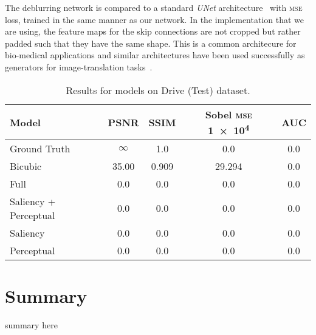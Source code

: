 \documentclass{scrartcl}
\begin{document}
The deblurring network is compared to a standard \textit{UNet} architecture~\cite{Unet} with \textsc{mse} loss, trained in the same manner as our network.
In the implementation that we are using, the feature maps for the skip connections are not cropped but rather padded such that they have the same shape.
This is a common architecure for bio-medical applications and similar architectures have been used successfully as generators for image-translation tasks~\cite{PatchGAN}.


\begin{table}[]
\centering
\caption{Results for models on Drive (Test) dataset.}

\label{tab:results-sr}
\begin{tabular}{@{}lS[table-format=2.3]S[table-format=2.3]S[table-format=2.3]S[table-format=2.3]@{}}
\toprule
{Model} & {PSNR} & {SSIM} & {Sobel \textsc{mse} \SI{1e4}{}} & {AUC} \\ \midrule
Ground Truth & $\infty$ & 1.0 & 0.0 & 0.0 \\
Bicubic & 35.00 & 0.909 & 29.294 & 0.0 \\
Full & 0.0 & 0.0 & 0.0 & 0.0 \\
Saliency + Perceptual & 0.0 & 0.0 & 0.0 & 0.0 \\
Saliency & 0.0 & 0.0 & 0.0 & 0.0 \\
Perceptual & 0.0 & 0.0 & 0.0 & 0.0 \\
\bottomrule
\end{tabular}
\end{table}


\section{Summary}
summary here

\printbibliography
\end{document}
